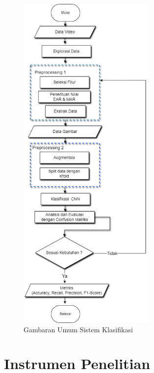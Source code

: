     \begin{figure}[H]
      \centering
      \includegraphics[width=0.6\textwidth]{figures/bab3/fowchart.png}
      \caption{Gambaran Umum Sistem Klasifikasi}
      \label{flowchart}
      \medskip %
      \begin{minipage}{0.8\textwidth}
        \centering

      \end{minipage}
    \end{figure}


    

\section{Instrumen Penelitian}

